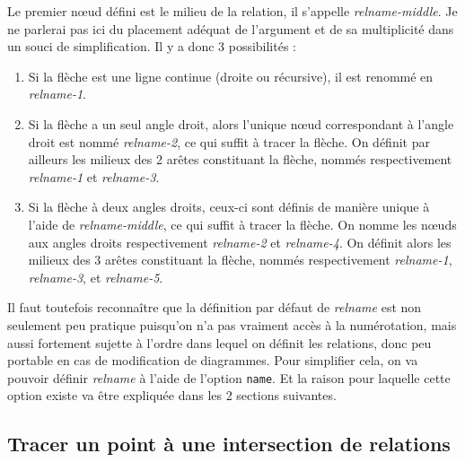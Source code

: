 \documentclass[a4paper,11pt]{report}
\newcommand{\inputTikZ}[1]{%
  }%
\newcommand{\inputTikZ}[1]{%
    \texttt{[image: fig/\#1.pdf]}%
  }%
\begin{document}
Le premier n\oe{}ud défini est le milieu de la relation, il s'appelle {\it relname-middle}. Je ne parlerai pas ici du placement adéquat de l'argument et de sa multiplicité dans un souci de simplification. Il y a donc 3 possibilités :

\begin{enumerate}
\item Si la flèche est une ligne continue (droite ou récursive), il est renommé en {\it relname-1}.

\begin{center}
\inputTikZ{relationptname}
\end{center}

\item Si la flèche a un seul angle droit, alors l'unique n\oe{}ud correspondant à l'angle droit est nommé {\it relname-2}, ce qui suffit à tracer la flèche. On définit par ailleurs les milieux des 2 arêtes constituant la flèche, nommés respectivement {\it relname-1} et {\it relname-3}.

\begin{center}
\inputTikZ{relationHVptname}
\end{center}

\item Si la flèche à deux angles droits, ceux-ci sont définis de manière unique à l'aide de {\it relname-middle}, ce qui suffit à tracer la flèche. On nomme les n\oe{}uds aux angles droits respectivement {\it relname-2} et {\it relname-4}. On définit alors les milieux des 3 arêtes constituant la flèche, nommés respectivement {\it relname-1}, {\it relname-3}, et {\it relname-5}.

\begin{center}
\inputTikZ{relationHVHptname}
\end{center}
\end{enumerate}

Il faut toutefois reconnaître que la définition par défaut de {\it relname} est non seulement peu pratique puisqu'on n'a pas vraiment accès à la numérotation, mais aussi fortement sujette à l'ordre dans lequel on définit les relations, donc peu portable en cas de modification de diagrammes. Pour simplifier cela, on va pouvoir définir {\it relname} à l'aide de l'option {\tt name}. Et la raison pour laquelle cette option existe va être expliquée dans les 2 sections suivantes.

\subsection{Tracer un point à une intersection de relations}\label{ss.relpt}
\end{document}
